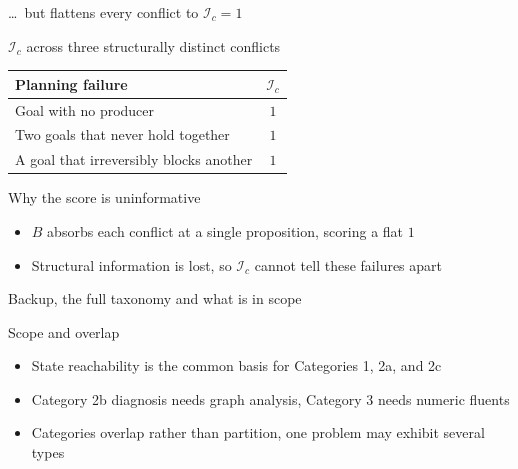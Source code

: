 \begin{frame}[noframenumbering]{\dots\ but flattens every conflict to $\mathcal{I}_c = 1$}
    \hypertarget{bk:naive-flat}{}
    \begin{exampleblock}{$\mathcal{I}_c$ across three structurally distinct conflicts}
        \centering
        \begin{tabular}{lc}
            \toprule
            Planning failure                        & $\mathcal{I}_c$ \\
            \midrule
            Goal with no producer                   & $1$             \\
            Two goals that never hold together      & $1$             \\
            A goal that irreversibly blocks another & $1$             \\
            \bottomrule
        \end{tabular}
    \end{exampleblock}

    \begin{block}{Why the score is uninformative}
        \begin{itemize}
            \item $B$ absorbs each conflict at a single proposition, scoring a flat $1$
            \item Structural information is lost, so $\mathcal{I}_c$ cannot tell these failures apart
        \end{itemize}
    \end{block}

\end{frame}


\begin{frame}[noframenumbering]{Backup, the full taxonomy and what is in scope}
    \hypertarget{bk:taxonomy-tree}{}
    
    \begin{block}{Scope and overlap}
        \begin{itemize}
            \item State reachability is the common basis for Categories 1, 2a, and 2c
            \item Category 2b diagnosis needs graph analysis, Category 3 needs numeric fluents
            \item Categories overlap rather than partition, one problem may exhibit several types
        \end{itemize}
    \end{block}

\end{frame}

